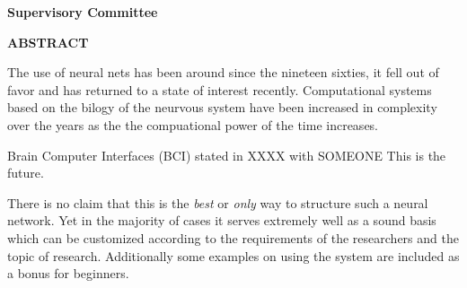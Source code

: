 \newpage
{}

\noindent \textbf{Supervisory Committee}
\tpbreak
\panel

\begin{center}
\textbf{ABSTRACT}
\end{center}

The use of neural nets has been around since the nineteen sixties, it fell out of favor and has returned to a state of interest recently. Computational systems based on the bilogy of the neurvous system have been increased in complexity over the years as the the compuational power of the time increases. 

Brain Computer Interfaces (BCI) stated in XXXX with SOMEONE This is the future. 

 There is no claim that this is the \textit{best} or \textit{only} way to structure such a neural network. Yet in the majority of cases it serves extremely well as a sound basis which can be customized according to the requirements of the researchers and the topic of  research. Additionally some examples on using the system are included as a bonus for beginners.
